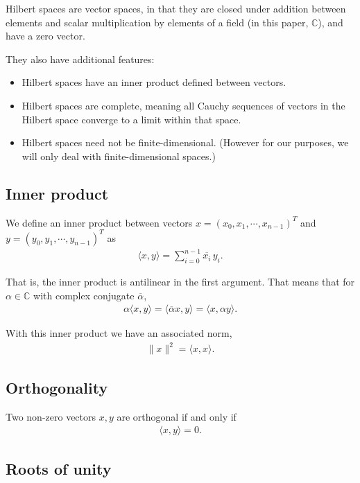 \documentclass[11pt]{article}
\begin{document}
Hilbert spaces are vector spaces, in that they are closed under addition between elements and scalar multiplication by elements of a field (in this paper, $\mathbb{C}$), and have a zero vector.

They also have additional features:
\begin{itemize}
    \item Hilbert spaces have an inner product defined between vectors.
    \item Hilbert spaces are complete, meaning all Cauchy sequences of vectors in the Hilbert space converge to a limit within that space.
    \item Hilbert spaces need not be finite-dimensional. (However for our purposes, we will only deal with finite-dimensional spaces.)
\end{itemize}

\subsection{Inner product}

We define an inner product between vectors $x = (x_0, x_1, \cdots, x_{n-1})^T$ and $y = (y_0, y_1, \cdots, y_{n-1})^T$ as
\begin{align*}
\langle x, y \rangle = \sum_{i=0}^{n-1} \overline{x_i}\, y_i.
\end{align*}

That is, the inner product is antilinear in the first argument. That means that for $\alpha \in \mathbb{C}$ with complex conjugate $\overline{\alpha}$,
\begin{align*}
\alpha \langle x, y \rangle = \langle \overline{\alpha} x, y \rangle = \langle x, \alpha y \rangle.
\end{align*}

With this inner product we have an associated norm,
\begin{align*}
\|x\|^2 = \langle x, x \rangle.
\end{align*}

\subsection{Orthogonality}

Two non-zero vectors $x, y$ are orthogonal if and only if
\begin{align*}
\langle x, y \rangle = 0.
\end{align*}

\subsection{Roots of unity}
\end{document}
